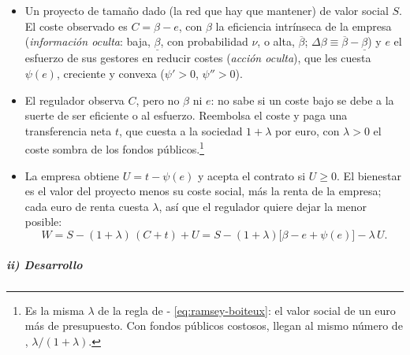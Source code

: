 \documentclass[11pt]{article}
\begin{document}
\begin{itemize}
\item Un proyecto de tamaño dado (la red que hay que mantener) de valor social $S$. El coste observado es $C=\beta-e$, con $\beta$ la eficiencia intrínseca de la empresa (\emph{información oculta}: baja, $\underline{\beta}$, con probabilidad $\nu$, o alta, $\overline{\beta}$; $\Delta\beta\equiv\overline{\beta}-\underline{\beta}$) y $e$ el esfuerzo de sus gestores en reducir costes (\emph{acción oculta}), que les cuesta $\psi(e)$, creciente y convexa ($\psi'>0$, $\psi''>0$).
\item El regulador observa $C$, pero no $\beta$ ni $e$: no sabe si un coste bajo se debe a la suerte de ser eficiente o al esfuerzo. Reembolsa el coste y paga una transferencia neta $t$, que cuesta a la sociedad $1+\lambda$ por euro, con $\lambda>0$ el coste sombra de los fondos públicos.\footnote{Es la misma $\lambda$ de la regla de - \eqref{eq:ramsey-boiteux}: el valor social de un euro más de presupuesto. Con fondos públicos costosos, \textcite[cap.~3]{LaffontTirole1993Theory} llegan al mismo número de , $\lambda/(1+\lambda)$.}
\item La empresa obtiene $U=t-\psi(e)$ y acepta el contrato si $U\geq 0$. El bienestar es el valor del proyecto menos su coste social, más la renta de la empresa; cada euro de renta cuesta $\lambda$, así que el regulador quiere dejar la menor posible:
  \[
  W=S-(1+\lambda)\,(C+t)+U=S-(1+\lambda)\big[\beta-e+\psi(e)\big]-\lambda\,U.
  \]
\end{itemize}

\subparagraph{ii) Desarrollo}
\end{document}
